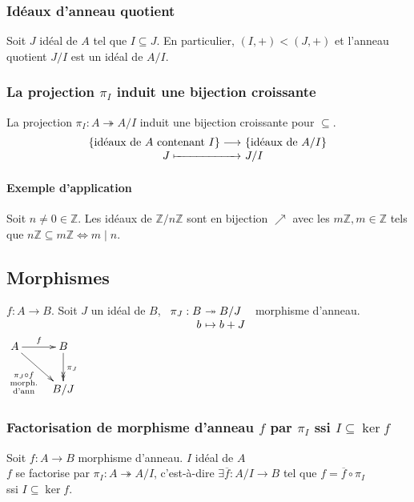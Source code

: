 \documentclass[reqno,a4paper,10pt]{report}
\newcommand{\set}[1]{\left\lbrace #1 \right\rbrace} %
\newcommand{\IZ}{\ensuremath{\mathbb{Z}}\xspace} %
\newcommand{\surj}{\twoheadrightarrow}
\begin{document}
\subsubsection{Idéaux d'anneau quotient}
Soit $J$ idéal de $A$ tel que $I\subseteq J$. En particulier, $(I,+) <
(J,+)$ et l'anneau quotient $J/I$ est un idéal de $A/I$.

\subsubsection{La projection $\pi_I$ induit une bijection croissante}
La projection $\pi_I : A \surj A/I$ induit une bijection croissante pour
$\subseteq$.
\[
\begin{array}[t]{r@{\ }l}
  \set{\text{idéaux de }A\text{ contenant } I} \longrightarrow&
  \set{\text{idéaux de }A/I}\\
  J \xmapsto{\hphantom{\textstyle \text{ contenant } I}}& J/I
\end{array}
\]

\paragraph{Exemple d'application}
Soit $n\neq 0 \in \IZ$. Les idéaux de $\IZ/n\IZ$ sont en bijection $\nearrow$
avec les $m\IZ, m \in \IZ$ tels que $n\IZ \subseteq m\IZ \iff m \mid n$.

\subsection{Morphismes}
$f : A \to B$. Soit $J$ un idéal de $B$, $\begin{array}[t]{r@{\ }l}
  \pi_J : B &\surj B/J\\
  b &\mapsto b+ J
\end{array}$ morphisme d'anneau. $\xymatrix{
A \ar[dr]_{\substack{\pi_J \circ f\\ \text{morph.}\\ \text{d'ann}}}
\ar[r]^f & B \ar@{->>}[d]^{\pi_J}\\
  & B/J
}$

\subsubsection{Factorisation de morphisme d'anneau $f$ par $\pi_I$ ssi $I
\subseteq \ker f$}
Soit $f:A\to B$ morphisme d'anneau. $I$ idéal de $A$\\
$f$ se factorise par $\pi_I:A\surj A/I$, c'est-à-dire $\exists
\overline{f}:A/I \to B$ tel que $f=\overline f \circ \pi_I$\\
ssi $I\subseteq \ker f$.
\end{document}
